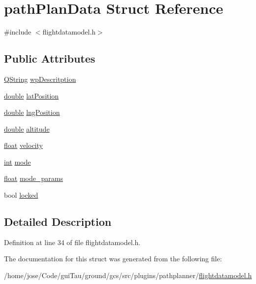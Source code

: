 \hypertarget{structpath_plan_data}{\section{path\-Plan\-Data Struct Reference}
\label{structpath_plan_data}
}


{\ttfamily \#include $<$flightdatamodel.\-h$>$}

\subsection*{Public Attributes}
\begin{DoxyCompactItemize}
\item 
\hyperlink{group___u_a_v_objects_plugin_gab9d252f49c333c94a72f97ce3105a32d}{Q\-String} \hyperlink{group___path_gac7fc0b526eac540aa404e9d3d6ee95ef}{wp\-Descritption}
\item 
\hyperlink{_super_l_u_support_8h_a8956b2b9f49bf918deed98379d159ca7}{double} \hyperlink{group___path_ga741da9e938717a4dba1a1b28afc94d07}{lat\-Position}
\item 
\hyperlink{_super_l_u_support_8h_a8956b2b9f49bf918deed98379d159ca7}{double} \hyperlink{group___path_ga28464ee2b2537b0bc670193bc29627b7}{lng\-Position}
\item 
\hyperlink{_super_l_u_support_8h_a8956b2b9f49bf918deed98379d159ca7}{double} \hyperlink{group___path_ga6684fc7c8c169232f70b43e4fedc6eb0}{altitude}
\item 
\hyperlink{_super_l_u_support_8h_a6a1bb6ed41f44b60e7bd83b0e9945aa7}{float} \hyperlink{group___path_ga58910b1bf08e8e02291db4ea420cc383}{velocity}
\item 
\hyperlink{ioapi_8h_a787fa3cf048117ba7123753c1e74fcd6}{int} \hyperlink{group___path_gabea436564f0d9df2abf6b4c35d505753}{mode}
\item 
\hyperlink{_super_l_u_support_8h_a6a1bb6ed41f44b60e7bd83b0e9945aa7}{float} \hyperlink{group___path_gaba12f55aa813b5f1dc707e3c1814ab14}{mode\-\_\-params}
\item 
bool \hyperlink{group___path_ga5e07c3e8bda93b1d5dba9dd3d35c0280}{locked}
\end{DoxyCompactItemize}


\subsection{Detailed Description}


Definition at line 34 of file flightdatamodel.\-h.



The documentation for this struct was generated from the following file\-:\begin{DoxyCompactItemize}
\item 
/home/jose/\-Code/gui\-Tau/ground/gcs/src/plugins/pathplanner/\hyperlink{flightdatamodel_8h}{flightdatamodel.\-h}\end{DoxyCompactItemize}
